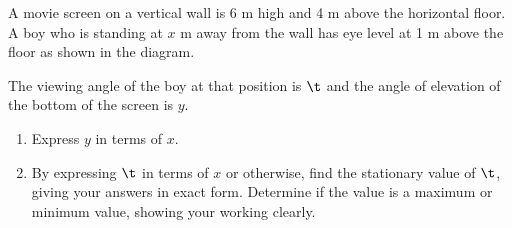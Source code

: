 \clearpage
\begin{problem}
    \begin{center}
    \end{center}
    
    A movie screen on a vertical wall is 6 m high and 4 m above the horizontal floor. A boy who is standing at $x$ m away from the wall has eye level at 1 m above the floor as shown in the diagram.

    The viewing angle of the boy at that position is $\t$ and the angle of elevation of the bottom of the screen is $y$.

    \begin{enumerate}
        \item Express $y$ in terms of $x$.
        \item By expressing $\t$ in terms of $x$ or otherwise, find the stationary value of $\t$, giving your answers in exact form. Determine if the value is a maximum or minimum value, showing your working clearly.
    \end{enumerate}
\end{problem}
